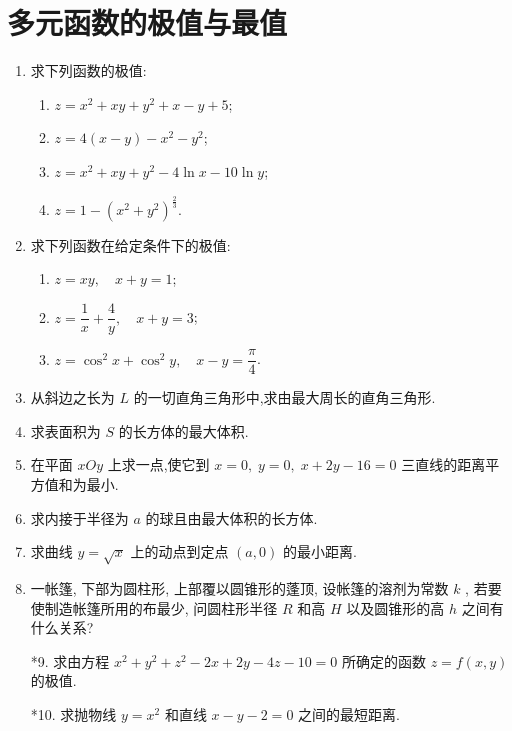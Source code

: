 \section{多元函数的极值与最值}

\begin{enumerate}\setlength{\itemsep}{7pt}
    \item 求下列函数的极值:
    \begin{enumerate}[(1)]\setlength{\itemsep}{5pt}\setlength{\topsep}{15pt}
        \item $z=x^2+xy+y^2+x-y+5$;
        \item $z=4(x-y)-x^2-y^2$;
        \item $z=x^2+xy+y^2-4\ln x-10\ln y$;
        \item $z=1-(x^2+y^2)^{\frac{2}{3}}$.
    \end{enumerate}

    \item 求下列函数在给定条件下的极值:
    \begin{enumerate}[(1)]\setlength{\itemsep}{5pt}\setlength{\topsep}{15pt}
        \item $z=xy,\quad x+y=1$;
        \item $z=\dfrac{1}{x}+\dfrac{4}{y},\quad x+y=3$;
        \item $z=\cos^2x+\cos^2y,\quad x-y=\dfrac{\pi}{4}$.
    \end{enumerate}

    \item 从斜边之长为 $L$ 的一切直角三角形中,求由最大周长的直角三角形.
    
    \item 求表面积为 $S$ 的长方体的最大体积.
    
    \item 在平面 $xOy$ 上求一点,使它到 $x=0,\;y=0,\;x+2y-16=0$ 三直线的距离平方值和为最小.
    
    \item 求内接于半径为 $a$ 的球且由最大体积的长方体.
    
    \item 求曲线 $y=\sqrt{x}$ 上的动点到定点 $(a, 0)$ 的最小距离.
    
    \item 一帐篷, 下部为圆柱形, 上部覆以圆锥形的蓬顶, 设帐篷的溶剂为常数 $k$ , 若要使制造帐篷所用的布最少, 问圆柱形半径 $R$ 和高 $H$ 以及圆锥形的高 $h$ 之间有什么关系?
    
    \item[*9.] 求由方程 $x^2+y^2+z^2-2x+2y-4z-10=0$ 所确定的函数 $z=f(x, y)$ 的极值.
    
    \item[*10.] 求抛物线 $y=x^2$ 和直线 $x-y-2=0$ 之间的最短距离. 
\end{enumerate}

